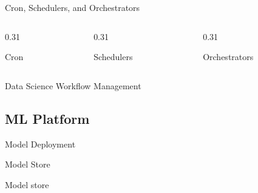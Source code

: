 \begin{frame}{Cron, Schedulers, and Orchestrators}
  \begin{columns}[T,onlytextwidth]
    \begin{column}{0.31\textwidth}
      \begin{tdblockt}[equal height group=rm]{Cron}
      \end{tdblockt}
    \end{column}
    \begin{column}{0.31\textwidth}
      \begin{tdblockt}[equal height group=rm]{Schedulers}
      \end{tdblockt}
    \end{column}
    \begin{column}{0.31\textwidth}
      \begin{tdblockt}[equal height group=rm]{Orchestrators}
      \end{tdblockt}
    \end{column}
  \end{columns}
\end{frame}

\begin{frame}{Data Science Workflow Management}
  \begin{sidebody}
  \end{sidebody}
\end{frame}

\subsection{ML Platform}

\begin{frame}{Model Deployment}
  \begin{withmargin}
    \begin{tdmain}
    \end{tdmain}
    \begin{tdmargin}
    \end{tdmargin}
  \end{withmargin}
\end{frame}

\begin{frame}{Model Store}
  \begin{tddef}{Model store}
  \end{tddef}
\end{frame}

